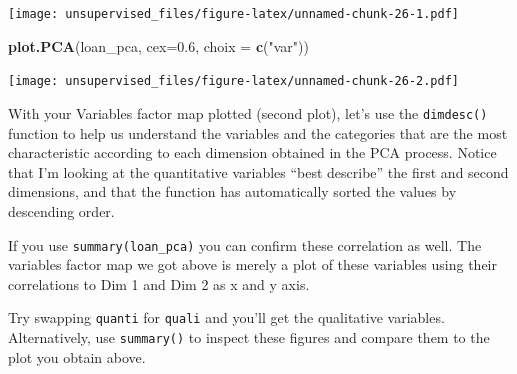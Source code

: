 \documentclass[]{article}
\newenvironment{Shaded}{\begin{snugshade}}{\end{snugshade}}
\newcommand{\DataTypeTok}[1]{\textcolor[rgb]{0.13,0.29,0.53}{#1}}
\newcommand{\DecValTok}[1]{\textcolor[rgb]{0.00,0.00,0.81}{#1}}
\newcommand{\FloatTok}[1]{\textcolor[rgb]{0.00,0.00,0.81}{#1}}
\newcommand{\KeywordTok}[1]{\textcolor[rgb]{0.13,0.29,0.53}{\textbf{#1}}}
\newcommand{\NormalTok}[1]{#1}
\newcommand{\OperatorTok}[1]{\textcolor[rgb]{0.81,0.36,0.00}{\textbf{#1}}}
\newcommand{\StringTok}[1]{\textcolor[rgb]{0.31,0.60,0.02}{#1}}
\begin{document}
\texttt{[image: unsupervised\_files/figure-latex/unnamed-chunk-26-1.pdf]}

\begin{Shaded}
\begin{Highlighting}[]
\KeywordTok{plot.PCA}\NormalTok{(loan_pca, }\DataTypeTok{cex=}\FloatTok{0.6}\NormalTok{, }\DataTypeTok{choix =} \KeywordTok{c}\NormalTok{(}\StringTok{"var"}\NormalTok{))}
\end{Highlighting}
\end{Shaded}

\texttt{[image: unsupervised\_files/figure-latex/unnamed-chunk-26-2.pdf]}

With your Variables factor map plotted (second plot), let's use the
\texttt{dimdesc()} function to help us understand the variables and the
categories that are the most characteristic according to each dimension
obtained in the PCA process. Notice that I'm looking at the quantitative
variables ``best describe'' the first and second dimensions, and that
the function has automatically sorted the values by descending order.

If you use \texttt{summary(loan\_pca)} you can confirm these correlation
as well. The variables factor map we got above is merely a plot of these
variables using their correlations to Dim 1 and Dim 2 as x and y axis.

Try swapping \texttt{quanti} for \texttt{quali} and you'll get the
qualitative variables. Alternatively, use \texttt{summary()} to inspect
these figures and compare them to the plot you obtain above.

\begin{Shaded}
\end{Shaded}
\end{document}
